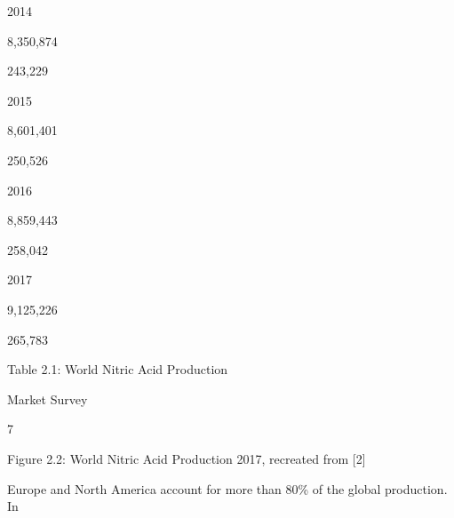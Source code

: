 \documentclass[a4paper,portrait,12pt]{article}
\begin{document}
2014





8,350,874





243,229





2015





8,601,401





250,526





2016





8,859,443





258,042





2017





9,125,226





265,783





\begin{flushleft}
Table 2.1: World Nitric Acid Production
\end{flushleft}





\begin{flushleft}
\newpage
Market Survey
\end{flushleft}





7





\begin{flushleft}
Figure 2.2: World Nitric Acid Production 2017, recreated from [2]
\end{flushleft}





\begin{flushleft}
Europe and North America account for more than 80\% of the global production. In
\end{flushleft}
\end{document}
